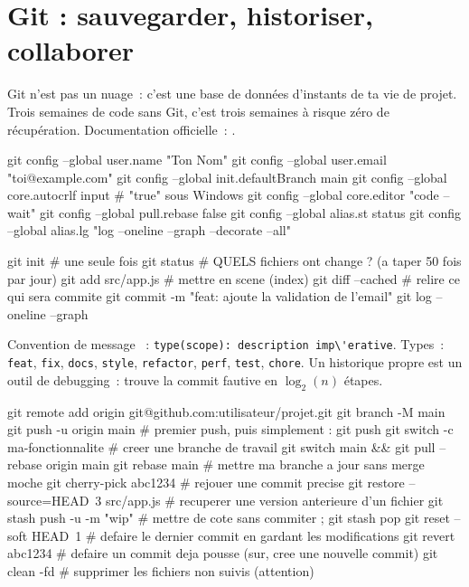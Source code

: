 \section{Git : sauvegarder, historiser, collaborer}

Git n'est pas un nuage~: c'est une base de donn\'ees d'instants de ta vie de projet.
Trois semaines de code sans Git, c'est trois semaines \`a risque z\'ero de r\'ecup\'eration.
Documentation officielle~: .

\begin{terminal}
git config --global user.name  "Ton Nom"
git config --global user.email "toi@example.com"
git config --global init.defaultBranch main
git config --global core.autocrlf input      # "true" sous Windows
git config --global core.editor "code --wait"
git config --global pull.rebase false
git config --global alias.st status
git config --global alias.lg "log --oneline --graph --decorate --all"
\end{terminal}

\begin{terminal}
git init                     # une seule fois
git status                   # QUELS fichiers ont change ? (a taper 50 fois par jour)
git add src/app.js           # mettre en scene (index)
git diff --cached            # relire ce qui sera commite
git commit -m "feat: ajoute la validation de l'email"
git log --oneline --graph
\end{terminal}

Convention de message ~:
\verb|type(scope): description imp\'erative|. Types~: \verb|feat|, \verb|fix|, \verb|docs|,
\verb|style|, \verb|refactor|, \verb|perf|, \verb|test|, \verb|chore|. Un historique propre est
un outil de debugging~:  trouve la commit fautive en $\log_2(n)$ \'etapes.

\begin{terminal}
git remote add origin git@github.com:utilisateur/projet.git
git branch -M main
git push -u origin main          # premier push, puis simplement : git push
git switch -c ma-fonctionnalite  # creer une branche de travail
git switch main && git pull --rebase origin main
git rebase main                  # mettre ma branche a jour sans merge moche
git cherry-pick abc1234          # rejouer une commit precise
git restore --source=HEAD~3 src/app.js   # recuperer une version anterieure d'un fichier
git stash push -u -m "wip"       # mettre de cote sans commiter ; git stash pop
git reset --soft HEAD~1          # defaire le dernier commit en gardant les modifications
git revert abc1234               # defaire un commit deja pousse (sur, cree une nouvelle commit)
git clean -fd                    # supprimer les fichiers non suivis (attention)
\end{terminal}

